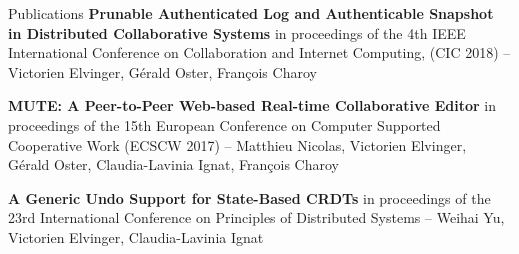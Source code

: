 \documentclass[xcolor=table,t,french]{beamer}
\begin{document}
{
\begin{frame}
    \vspace{0.85\textheight}
\end{frame}
}

\begin{frame}{Publications}
    \textbf{Prunable Authenticated Log and Authenticable Snapshot in Distributed Collaborative Systems} in proceedings of the 4th {IEEE} International Conference on Collaboration and Internet Computing, ({CIC} 2018) -- Victorien Elvinger, Gérald Oster, François Charoy

    \textbf{MUTE\@: A Peer-to-Peer Web-based Real-time Collaborative Editor} in proceedings of the 15th European Conference on Computer Supported Cooperative Work ({ECSCW} 2017) -- Matthieu Nicolas, Victorien Elvinger, Gérald Oster, Claudia-Lavinia Ignat,
    François Charoy

    \textbf{A Generic Undo Support for State-Based CRDTs} in proceedings of the 23rd International Conference on Principles of Distributed Systems -- Weihai Yu, Victorien Elvinger, Claudia-Lavinia Ignat
\end{frame}

\begin{frame}[allowframebreaks]
    \vspace{1em}
    \printbibliography%
\end{frame}



\end{document}
